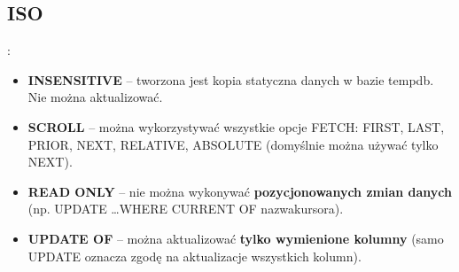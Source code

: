 \documentclass[a4paper]{article}
\begin{document}
    \subsection{ISO}:
    \begin{itemize}
        \item \textbf{INSENSITIVE} – tworzona jest kopia statyczna danych w bazie tempdb. Nie można aktualizować.
        \item \textbf{SCROLL} – można wykorzystywać wszystkie opcje FETCH: FIRST, LAST, PRIOR, NEXT, RELATIVE, ABSOLUTE (domyślnie można używać tylko NEXT).
        \item \textbf{READ ONLY} – nie można wykonywać \textbf{pozycjonowanych zmian danych} (np. UPDATE \dots WHERE CURRENT OF nazwakursora).
        \item \textbf{UPDATE OF} – można aktualizować \textbf{tylko wymienione kolumny} (samo UPDATE oznacza zgodę na aktualizacje wszystkich kolumn).
    \end{itemize}
\end{document}
